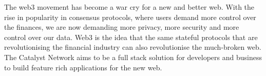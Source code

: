The web3 movement has become a war cry for a new and better web. With the rise in popularity in consensus protocols, where users demand more control over the finances, we are now demanding more privacy, more security and more control over our data. Web3 is the idea that the same stateful protocols that are revolutionising the financial industry can also revolutionise the much-broken web. The Catalyst Network aims to be a full stack solution for developers and business to build feature rich applications for the new web.